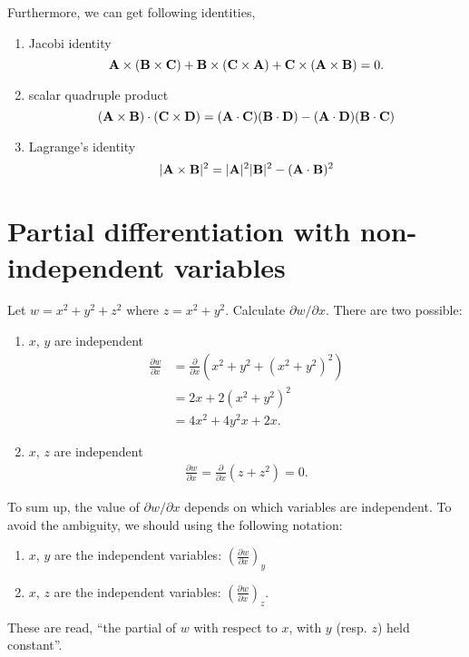 Furthermore, we can get following identities,
\begin{enumerate}
\item Jacobi identity
\begin{equation}
\mathbf{A}\times(\mathbf{B}\times\mathbf{C}) + \mathbf{B}\times(\mathbf{C}\times\mathbf{A}) + \mathbf{C}\times(\mathbf{A}\times\mathbf{B}) = 0.
\end{equation}

\item scalar quadruple product
\begin{equation}
(\mathbf{A}\times\mathbf{B})\cdot(\mathbf{C}\times\mathbf{D}) = (\mathbf{A}\cdot\mathbf{C})(\mathbf{B}\cdot\mathbf{D}) - (\mathbf{A}\cdot\mathbf{D})(\mathbf{B}\cdot\mathbf{C})
\end{equation}

\item Lagrange’s identity
\begin{equation}
|\mathbf{A}\times\mathbf{B}|^2 = |\mathbf{A}|^2 |\mathbf{B}|^2 - (\mathbf{A}\cdot\mathbf{B})^2
\end{equation}
\end{enumerate}

\section{Partial differentiation with non-independent variables}

\begin{example}
Let $w = x^2 + y^2 + z^2$ where $z = x^2 + y^2$. Calculate $\partial w/\partial x$.
There are two possible:

\begin{enumerate}[label = (\alph*)]
\item $x$, $y$ are independent
\begin{equation*}
\begin{split}
\frac{\partial w}{\partial x} &= \frac{\partial}{\partial x} (x^2 + y^2 + (x^2 + y^2)^2) \\
&= 2x + 2(x^2 + y^2)^2 \\
&= 4x^2 + 4y^2x + 2x.
\end{split}
\end{equation*}
\item $x$, $z$ are independent
\begin{equation*}
\begin{split}
\frac{\partial w}{\partial x} = \frac{\partial}{\partial x}(z + z^2) = 0.
\end{split}
\end{equation*}
\end{enumerate}

To sum up, the value of $\partial w/\partial x$ depends on which variables are independent.
To avoid the ambiguity, we should using the following notation:

\begin{enumerate}[label=Case (\alph*), wide, itemsep =0pt]
\item  $x$, $y$ are the independent variables: $\left(\frac{\partial w}{\partial x}\right)_y$
\item  $x$, $z$ are the independent variables: $\left(\frac{\partial w}{\partial x}\right)_z$.
\end{enumerate}

These are read, “the partial of $w$ with respect to $x$, with $y$ (resp. $z$) held constant”.
\end{example}

